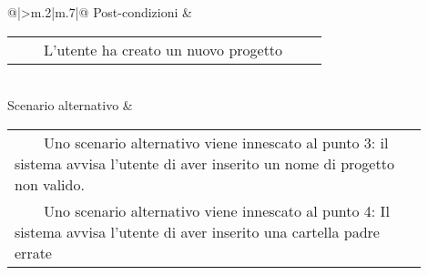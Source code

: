 \begin{table}[H]
\begin{longtable}{@{}|>{\centering\arraybackslash}m{.2\textwidth}|m{.7\textwidth}|@{}}
		Post-condizioni & \begin{tabular}{m{0.9\linewidth}}~~\llap{\textbullet}~~L'utente ha creato un nuovo progetto\\\end{tabular}\\
		Scenario alternativo & \begin{tabular}{m{0.9\linewidth}}~~\llap{\textbullet}~~Uno scenario alternativo viene innescato al punto 3: il sistema avvisa l'utente di aver inserito un nome di progetto non valido.\\~~\llap{\textbullet}~~Uno scenario alternativo viene innescato al punto 4: Il sistema avvisa l'utente di aver inserito una cartella padre errate\\\end{tabular}\\\hline
		
	\end{longtable}
\end{table}

